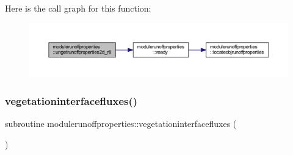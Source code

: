 Here is the call graph for this function\+:\nopagebreak
\begin{figure}[H]
\begin{center}
\leavevmode
\includegraphics[width=350pt]{namespacemodulerunoffproperties_abb57930bec871aba1885b2ccb5a1eaee_cgraph}
\end{center}
\end{figure}
\mbox{\label{namespacemodulerunoffproperties_ab3ab37be90febb6cff96da7ee7284955}} 
\subsubsection{\texorpdfstring{vegetationinterfacefluxes()}{vegetationinterfacefluxes()}}
{\footnotesize\ttfamily subroutine modulerunoffproperties\+::vegetationinterfacefluxes (\begin{DoxyParamCaption}{ }\end{DoxyParamCaption})\hspace{0.3cm}{\ttfamily [private]}}

